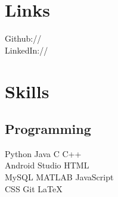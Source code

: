 \documentclass[]{deedy-resume-openfont}
\begin{document}
\begin{minipage}[t]{0.33\textwidth}

\section{Links} 
Github:// \href{https://github.com/nishu88}{} \\
LinkedIn://  \href{https://www.linkedin.com/in/nishanth-d-aluhonnu-a3687712a/}{} \\
\sectionsep





\section{Skills}
\subsection{Programming}
Python \textbullet{} Java \textbullet{}   C \textbullet{} C++\\

 \textbullet{} Android Studio \textbullet{} HTML \\ \textbullet{} MySQL \textbullet{} MATLAB \textbullet{} JavaScript\\ \textbullet{} CSS \textbullet{} Git \textbullet{} \LaTeX
\sectionsep

%
%

\end{minipage} 
\hfill
\end{document}
